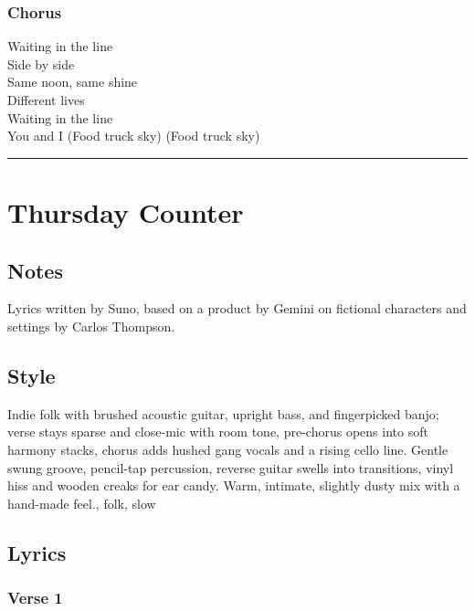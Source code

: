 \subsubsection{Chorus}\label{chorus-9}

Waiting in the line\\
Side by side\\
Same noon, same shine\\
Different lives\\
Waiting in the line\\
You and I (Food truck sky) (Food truck sky)

\begin{center}\rule{0.5\linewidth}{0.5pt}\end{center}

\section{Thursday Counter}\label{thursday-counter}

\subsection{Notes}\label{notes-6}

Lyrics written by Suno, based on a product by Gemini on fictional
characters and settings by Carlos Thompson.

\subsection{Style}\label{style-6}

Indie folk with brushed acoustic guitar, upright bass, and fingerpicked
banjo; verse stays sparse and close-mic with room tone, pre-chorus opens
into soft harmony stacks, chorus adds hushed gang vocals and a rising
cello line. Gentle swung groove, pencil-tap percussion, reverse guitar
swells into transitions, vinyl hiss and wooden creaks for ear candy.
Warm, intimate, slightly dusty mix with a hand-made feel., folk, slow

\subsection{Lyrics}\label{lyrics-6}

\subsubsection{Verse 1}\label{verse-1-2}


